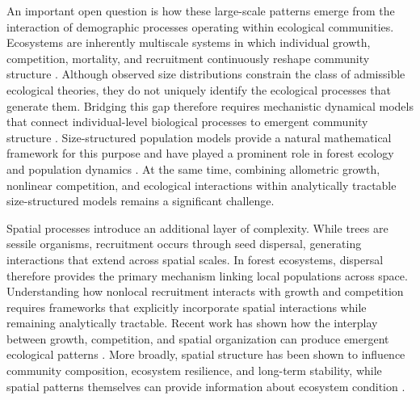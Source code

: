 \documentclass[aps,pre,twocolumn,superscriptaddress,10pt]{revtex4-2}
\begin{document}
An important open question is how these large-scale patterns emerge from the interaction of demographic processes operating within ecological communities. Ecosystems are inherently multiscale systems in which individual growth, competition, mortality, and recruitment continuously reshape community structure \cite{Levin1992}. Although observed size distributions constrain the class of admissible ecological theories, they do not uniquely identify the ecological processes that generate them. Bridging this gap therefore requires mechanistic dynamical models that connect individual-level biological processes to emergent community structure \cite{Xiao_JOD_2016}. 
Size-structured population models provide a natural mathematical framework for this purpose and have played a prominent role in forest ecology and population dynamics \cite{McKendrick_1925,Levin_1974,Takada1986,keyfitz1997mckendrick,kohyama1991simulating,kohyama1992density,kohyama1993size,kohyama2003tree,murray2003mathematical,muller2006comparing,o2009integrative}. At the same time, combining allometric growth, nonlinear competition, and ecological interactions within analytically tractable size-structured models remains a significant challenge.

Spatial processes introduce an additional layer of complexity. While trees are sessile organisms, recruitment occurs through seed dispersal, generating interactions that extend across spatial scales. In forest ecosystems, dispersal therefore provides the primary mechanism linking local populations across space. Understanding how nonlocal recruitment interacts with growth and competition requires frameworks that explicitly incorporate spatial interactions while remaining analytically tractable. Recent work has shown how the interplay between growth, competition, and spatial organization can produce emergent ecological patterns \cite{lee2021growth}. More broadly, spatial structure has been shown to influence community composition, ecosystem resilience, and long-term stability, while spatial patterns themselves can provide information about ecosystem condition \cite{Nathan2000,Wiegand2021,Kalyuzhny2023,Bernardi2026}.
\end{document}
